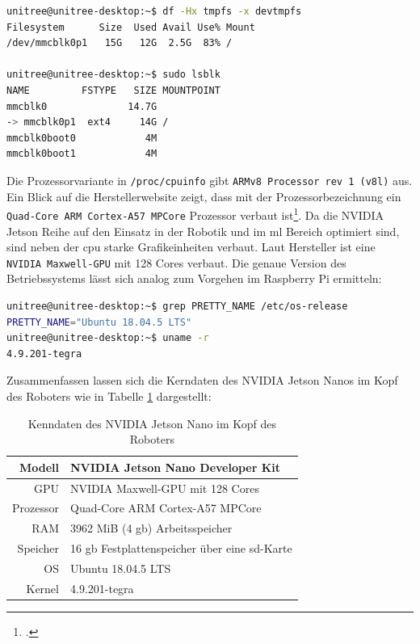 \begin{lstlisting}[language=sh, label=lst:nanos-kopf-fs, columns=fixed]
unitree@unitree-desktop:~$ df -Hx tmpfs -x devtmpfs
Filesystem      Size  Used Avail Use% Mount
/dev/mmcblk0p1   15G   12G  2.5G  83% /

unitree@unitree-desktop:~$ sudo lsblk
NAME         FSTYPE   SIZE MOUNTPOINT
mmcblk0              14.7G
-> mmcblk0p1  ext4     14G /
mmcblk0boot0            4M
mmcblk0boot1            4M
\end{lstlisting}

\noindent Die Prozessorvariante in \texttt{/proc/cpuinfo} gibt \texttt{ARMv8 Processor rev 1 (v8l)} aus.
Ein Blick auf die Herstellerwebsite zeigt, dass mit der Prozessorbezeichnung ein \texttt{Quad-Core ARM Cortex-A57 MPCore} Prozessor verbaut ist\footcite{nvidia_website_vergleich}.
Da die NVIDIA Jetson Reihe auf den Einsatz in der Robotik und im \gls{ml} Bereich optimiert sind, sind neben der \gls{cpu}
starke Grafikeinheiten verbaut.
Laut Hersteller ist eine \texttt{NVIDIA Maxwell-GPU} mit 128 Cores verbaut.
Die genaue Version des Betriebssystems lässt sich analog zum Vorgehen im Raspberry Pi ermitteln:

\begin{lstlisting}[language=sh, label=lst:nanos-kopf-os]
unitree@unitree-desktop:~$ grep PRETTY_NAME /etc/os-release
PRETTY_NAME="Ubuntu 18.04.5 LTS"
unitree@unitree-desktop:~$ uname -r
4.9.201-tegra
\end{lstlisting}

Zusammenfassen lassen sich die Kerndaten des NVIDIA Jetson Nanos im Kopf des Roboters wie in Tabelle \ref{tab:data-head-nano} dargestellt:

\begin{table}[h]
    \centering
    \begin{tabularx}{\textwidth}{|r|X|}
        \hline
        Modell    & NVIDIA Jetson Nano Developer Kit                               \\ \hline
        GPU       & NVIDIA Maxwell-GPU mit 128 Cores                               \\ \hline
        Prozessor & Quad-Core ARM Cortex-A57 MPCore                                \\ \hline
        RAM       & \num{3962} MiB (\num{4} \gls{gb}) Arbeitsspeicher              \\ \hline
        Speicher  & \num{16} \gls{gb} Festplattenspeicher über eine \gls{sd}-Karte \\ \hline
        OS        & Ubuntu 18.04.5 LTS                                             \\ \hline
        Kernel    & 4.9.201-tegra                                                  \\ \hline
    \end{tabularx}\caption{Kenndaten des NVIDIA Jetson Nano im Kopf des Roboters}\label{tab:data-head-nano}
\end{table}


